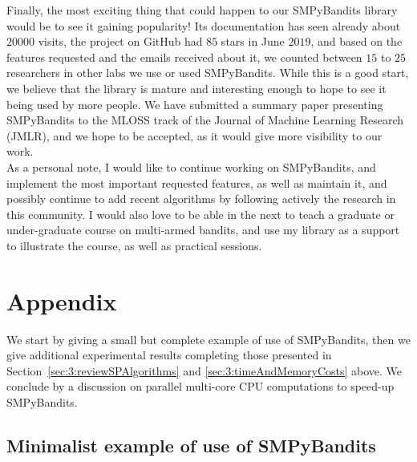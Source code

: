 Finally, the most exciting thing that could happen to our SMPyBandits library would be to see it gaining popularity!
Its documentation has seen already about $20000$ visits, the project on GitHub had $85$ stars in June $2019$, and based on the features requested and the emails received about it, we counted between $15$ to $25$ researchers in other labs we use or used SMPyBandits.
While this is a good start, we believe that the library is mature and interesting enough to hope to see it being used by more people.
%
We have submitted a summary paper presenting SMPyBandits \cite{SMPyBanditsJMLR} to the MLOSS track of the Journal of Machine Learning Research (JMLR), and we hope to be accepted, as it would give more visibility to our work.\\
%
\indent
As a personal note, I would like to continue working on SMPyBandits, and implement the most important requested features, as well as maintain it, and possibly continue to add recent algorithms by following actively the research in this community.
I would also love to be able in the next to teach a graduate or under-graduate course on multi-armed bandits, and use my library as a support to illustrate the course, as well as practical sessions.


\newpage  %
\section{Appendix}
\label{sec:3:appendix}

We start by giving a small but complete example of use of SMPyBandits, then we give additional experimental results completing those presented in Section~\ref{sec:3:reviewSPAlgorithms} and \ref{sec:3:timeAndMemoryCosts} above.
We conclude by a discussion on parallel multi-core CPU computations to speed-up SMPyBandits.


\subsection{Minimalist example of use of SMPyBandits}
\label{sub:3:miniExampleSMPyBandits}

